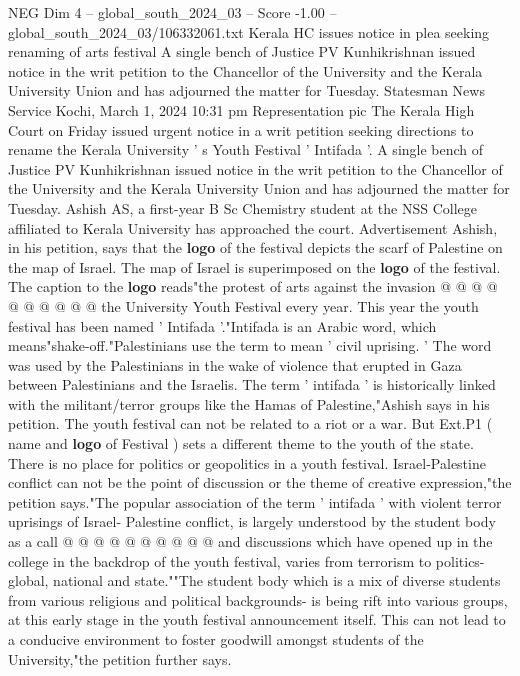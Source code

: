 \begin{textsample}{NEG Dim 4 – global\_south\_2024\_03 – Score -1.00 – global\_south\_2024\_03/106332061.txt}  \label{ex:f4_neg_351}
Kerala HC issues notice in plea seeking renaming of arts festival A single bench of Justice PV Kunhikrishnan issued notice in the writ petition to the Chancellor of the University and the Kerala University Union and has adjourned the matter for Tuesday.
Statesman News Service Kochi, March 1, 2024 10:31 pm Representation pic The Kerala High Court on Friday issued urgent notice in a writ petition seeking directions to rename the Kerala University ' s Youth Festival ' Intifada '.
A single bench of Justice PV Kunhikrishnan issued notice in the writ petition to the Chancellor of the University and the Kerala University Union and has adjourned the matter for Tuesday.
Ashish AS, a first-year B Sc Chemistry student at the NSS College affiliated to Kerala University has approached the court.
Advertisement Ashish, in his petition, says that the \textbf{logo} of the festival depicts the scarf of Palestine on the map of Israel.
The map of Israel is superimposed on the \textbf{logo} of the festival.
The caption to the \textbf{logo} reads"the protest of arts against the invasion @ @ @ @ @ @ @ @ @ @ the University Youth Festival every year.
This year the youth festival has been named ' Intifada '."Intifada is an Arabic word, which means"shake-off."Palestinians use the term to mean ' civil uprising. ' The word was used by the Palestinians in the wake of violence that erupted in Gaza between Palestinians and the Israelis.
The term ' intifada ' is historically linked with the militant/terror groups like the Hamas of Palestine,"Ashish says in his petition.
The youth festival can not be related to a riot or a war.
But Ext.P1 ( name and \textbf{logo} of Festival ) sets a different theme to the youth of the state.
There is no place for politics or geopolitics in a youth festival.
Israel-Palestine conflict can not be the point of discussion or the theme of creative expression,"the petition says."The popular association of the term ' intifada ' with violent terror uprisings of Israel- Palestine conflict, is largely understood by the student body as a call @ @ @ @ @ @ @ @ @ @ and discussions which have opened up in the college in the backdrop of the youth festival, varies from terrorism to politics- global, national and state.""The student body which is a mix of diverse students from various religious and political backgrounds- is being rift into various groups, at this early stage in the youth festival announcement itself.
This can not lead to a conducive environment to foster goodwill amongst students of the University,"the petition further says.

\end{textsample}
